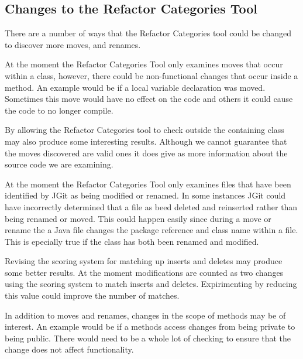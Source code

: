\subsection{Changes to the Refactor Categories Tool}
There are a number of ways that the Refactor Categories tool could be changed to discover more moves, and renames.

At the moment the Refactor Categories Tool only examines moves that occur within a class, however, there could be non-functional changes that occur inside a method. 
An example would be if a local variable declaration was moved.
Sometimes this move would have no effect on the code and others it could cause the code to no longer compile.

By allowing the Refactor Categories tool to check outside the containing class may also produce some interesting results.
Although we cannot guarantee that the moves discovered are valid ones it does give as more information about the source code we are examining.

At the moment the Refactor Categories Tool only examines files that have been identified by JGit as being modified or renamed.
In some instances JGit could have incorrectly determined that a file as beed deleted and reinserted rather than being renamed or moved.
This could happen easily since during a move or rename the a Java file changes the package reference and class name within a file.
This is epecially true if the class has both been renamed and modified.
   
Revising the scoring system for matching up inserts and deletes may produce some better results.
At the moment modifications are counted as two changes using the scoring system to match inserts and deletes.
Expirimenting by reducing this value could improve the number of matches.

In addition to moves and renames, changes in the scope of methods may be of interest.
An example would be if a methods access changes from being private to being public.
There would need to be a whole lot of checking to ensure that the change does not affect functionality.

